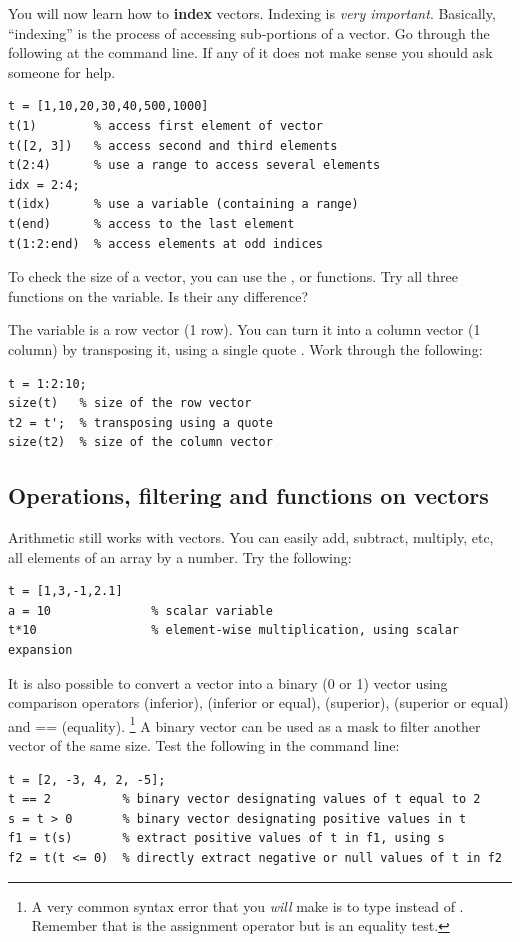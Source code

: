 \documentclass{article}
\begin{document}
You will now learn how to \textbf{index} vectors.
Indexing is \emph{very important}.
Basically, ``indexing'' is the process of accessing sub-portions of a vector.
Go through the following at the command line.
If any of it does not make sense you should ask someone for help.
\begin{lstlisting}
t = [1,10,20,30,40,500,1000]
t(1)        % access first element of vector
t([2, 3])   % access second and third elements
t(2:4)      % use a range to access several elements
idx = 2:4;
t(idx)      % use a variable (containing a range)
t(end)      % access to the last element
t(1:2:end)  % access elements at odd indices
\end{lstlisting}

To check the size of a vector, you can use the ,  or  functions.
Try all three functions on the  variable. Is their any difference?

The variable  is a row vector (1 row).
You can turn it into a column vector (1 column) by transposing it, using a single quote .
Work through the following:
\begin{lstlisting}
t = 1:2:10;
size(t)   % size of the row vector
t2 = t';  % transposing using a quote
size(t2)  % size of the column vector
\end{lstlisting}


\subsection{Operations, filtering and functions on vectors}

Arithmetic still works with vectors.
You can easily add, subtract, multiply, etc, all elements of an array by a number.
Try the following:
\begin{lstlisting}
t = [1,3,-1,2.1]
a = 10              % scalar variable
t*10                % element-wise multiplication, using scalar expansion
\end{lstlisting}

It is also possible to convert a vector into a binary (0 or 1) vector using comparison operators \mcode{<} (inferior), \mcode{<=} (inferior or equal), \mcode{>} (superior), \mcode{>=} (superior or equal) and {==} (equality).%
\footnote{%
  A very common syntax error that you \emph{will} make is to type  instead of .
  Remember that \mcode{=} is the assignment operator but \mcode{==} is an equality test.
}
A binary vector can be used as a mask to filter another vector of the same size.
Test the following in the command line:
\begin{lstlisting}
t = [2, -3, 4, 2, -5];
t == 2          % binary vector designating values of t equal to 2
s = t > 0       % binary vector designating positive values in t
f1 = t(s)       % extract positive values of t in f1, using s
f2 = t(t <= 0)  % directly extract negative or null values of t in f2
\end{lstlisting}
\end{document}
